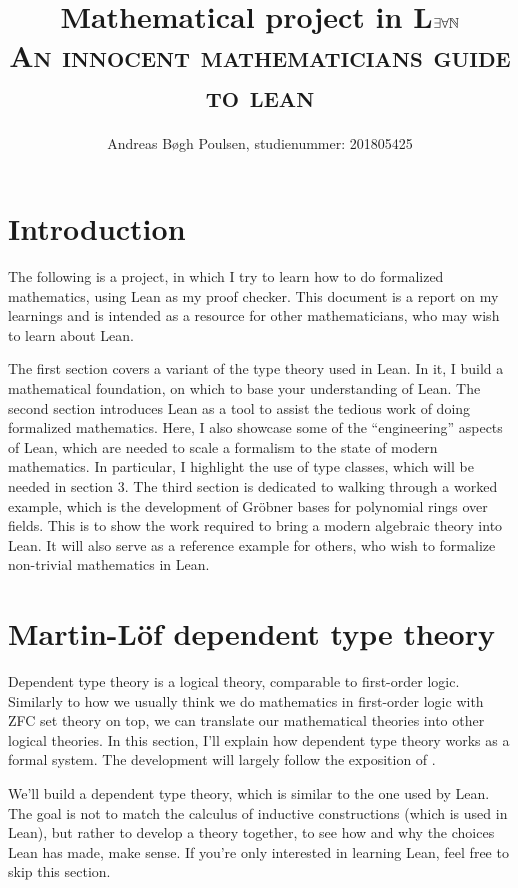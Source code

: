 \documentclass[a4paper, 12pt]{article}
\title{Mathematical project in \textsf{L$\exists \forall\mathbb{N}$}\\{\large \textsc{An innocent mathematicians guide to lean}}}
\author{Andreas Bøgh Poulsen, studienummer: 201805425}
\theoremstyle{changedot}
\theoremstyle{changedotbreak}
\theoremstyle{nonumberplain}
\begin{document}
\maketitle
\tableofcontents

\newpage
\begin{abstract}

\end{abstract}
\newpage

\section*{Introduction}
The following is a project, in which I try to learn how to do formalized mathematics, using Lean as my proof checker. This document is a report on my learnings and is intended as a resource for other mathematicians, who may wish to learn about Lean.

The first section covers a variant of the type theory used in Lean. In it, I build a mathematical foundation, on which to base your understanding of Lean. The second section introduces Lean as a tool to assist the tedious work of doing formalized mathematics. Here, I also showcase some of the ``engineering'' aspects of Lean, which are needed to scale a formalism to the state of modern mathematics. In particular, I highlight the use of type classes, which will be needed in section 3. The third section is dedicated to walking through a worked example, which is the development of Gröbner bases for polynomial rings over fields. This is to show the work required to bring a modern algebraic theory into Lean. It will also serve as a reference example for others, who wish to formalize non-trivial mathematics in Lean.

\section{Martin-Löf dependent type theory}\label{sec:tt}
Dependent type theory is a logical theory, comparable to first-order logic. Similarly to how we usually think we do mathematics in first-order logic with ZFC set theory on top, we can translate our mathematical theories into other logical theories. In this section, I'll explain how dependent type theory works as a formal system. The development will largely follow the exposition of \cite{rijke2022introduction}.

We'll build a dependent type theory, which is similar to the one used by Lean. The goal is not to match the calculus of inductive constructions (which is used in Lean), but rather to develop a theory together, to see how and why the choices Lean has made, make sense. If you're only interested in learning Lean, feel free to skip this section.
\end{document}
